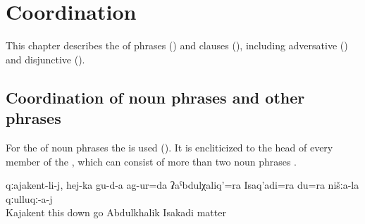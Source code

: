 \chapter{Coordination}
\label{cpt:Coordination}

This chapter describes the  of phrases () and clauses (), including adversative () and disjunctive  ().

\section{Coordination of noun phrases and other phrases}
\label{sec:Coordination of noun phrases and other phrases}

For the  of noun phrases the   is used (). It is encliticized to the head of every member of the , which can consist of more than two noun phrases .
%
\begin{exe}
	\ex	\label{ex:‎‎‎To Kajakent, from here up downwards we travelled, Abdukhalik, Isakadi and me, for our matters}
	\gll	qːajakent-li-j,	hej-ka	gu-d-a	ag-ur=da	ʡaˁbdulχaliq'=ra	Isaq'adi=ra	du=ra	nišːa-la	qːulluqː-a-j\\
		Kajakent	this	down	go	Abdulkhalik\tsc{=add} Isakadi			matter\\
	\glt	{}
\end{exe}

